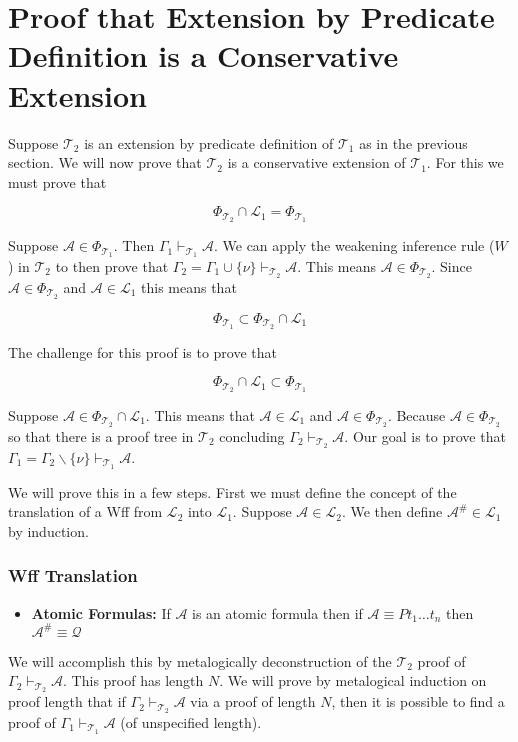 \documentclass[12pt]{article}
\newcommand{\mc}[1]{\mathcal{#1}}
\begin{document}
\section{Proof that Extension by Predicate Definition is a Conservative Extension}

Suppose $\mc{T}_2$ is an extension by predicate definition of $\mc{T}_1$ as in the previous section.
We will now prove that $\mc{T}_2$ is a conservative extension of $\mc{T}_1$.
For this we must prove that

$$
\Phi_{\mc{T}_2} \cap \mc{L}_1 = \Phi_{\mc{T}_1}
$$

Suppose $\mc{A} \in \Phi_{\mc{T}_1}$.
Then $\Gamma_1 \vdash_{\mc{T}_1} \mc{A}$.
We can apply the weakening inference rule ($W$) in $\mc{T}_2$ to then prove that $\Gamma_2 = \Gamma_1 \cup \{\nu\} \vdash_{\mc{T}_2} \mc{A}$.
This means $\mc{A} \in \Phi_{\mc{T}_2}$.
Since $\mc{A} \in \Phi_{\mc{T}_2}$ and $\mc{A} \in \mc{L}_1$ this means that

$$
\Phi_{\mc{T}_1} \subset \Phi_{\mc{T}_2} \cap \mc{L}_1
$$

The challenge for this proof is to prove that 

$$
\Phi_{\mc{T}_2} \cap \mc{L}_1 \subset \Phi_{\mc{T}_1}
$$

Suppose $\mc{A} \in \Phi_{\mc{T}_2} \cap \mc{L}_1$.
This means that $\mc{A} \in \mc{L}_1$ and $\mc{A} \in \Phi_{\mc{T}_2}$.
Because $\mc{A} \in \Phi_{\mc{T}_2}$ so that there is a proof tree in $\mc{T}_2$ concluding $\Gamma_2 \vdash_{\mc{T}_2} \mc{A}$.
Our goal is to prove that $\Gamma_1 = \Gamma_2 \backslash \{\nu\} \vdash_{\mc{T}_1} \mc{A}$.

We will prove this in a few steps.
First we must define the concept of the translation of a Wff from $\mc{L}_2$ into $\mc{L}_1$.
Suppose $\mc{A} \in \mc{L}_2$. 
We then define $\mc{A}^\# \in \mc{L}_1$ by induction.

\hrulefill
\subsubsection*{Wff Translation}
\begin{itemize}
\item{\textbf{Atomic Formulas:} If $\mc{A}$ is an atomic formula then if $\mc{A} \equiv Pt_1\ldots t_n$ then $\mc{A}^\# \equiv \mc{Q}$}
\end{itemize}
\hrulefill


We will accomplish this by metalogically deconstruction of the $\mc{T}_2$ proof of $\Gamma_2 \vdash_{\mc{T}_2} \mc{A}$.
This proof has length $N$.
We will prove by metalogical induction on proof length that if $\Gamma_2 \vdash_{\mc{T}_2} \mc{A}$ via a proof of length $N$, then it is possible to find a proof of $\Gamma_1 \vdash_{\mc{T}_1} \mc{A}$ (of unspecified length).
\end{document}
